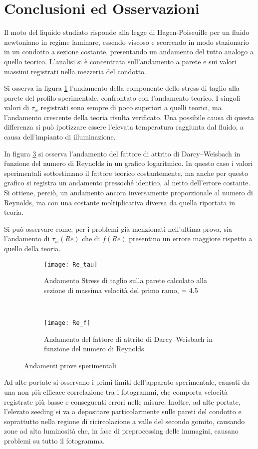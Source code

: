 \documentclass{article} %
\newcommand{\xd}{\nicefrac{\textrm{x}}{\textrm{D}}}
\begin{document}
\section{Conclusioni ed Osservazioni}
Il moto del liquido studiato risponde alla legge di Hagen-Poiseuille per un fluido newtoniano in regime laminare, essendo viscoso e scorrendo in modo stazionario in un condotto a sezione costante, presentando un andamento del tutto analogo a quello teorico. L'analisi si è concentrata sull'andamento a parete e sui valori massimi registrati nella mezzeria del condotto.\par
Si osserva in figura \ref{fig:Re_f} l'andamento della componente dello stress di taglio alla parete del profilo sperimentale, confrontato con l'andamento teorico. I singoli valori di $\tau_w$ registrati sono sempre di poco superiori a quelli teorici, ma l'andamento crescente della teoria risulta verificato. Una possibile causa di questa differenza si può ipotizzare essere l'elevata temperatura raggiunta dal fluido, a causa dell'impianto di illuminazione.\par
In figura \ref{fig:Re_tau} si osserva l'andamento del fattore di attrito di Darcy–Weisbach in funzione del numero di Reynolds in un grafico logaritmico. In questo caso i valori sperimentali sottostimano il fattore teorico costantemente, ma anche per questo grafico si registra un andamento pressoché identico, al netto dell'errore costante. Si ottiene, perciò, un andamento ancora inversamente proporzionale al numero di Reynolds, ma con una costante moltiplicativa diversa da quella riportata in teoria.\par
Si può osservare come, per i problemi già menzionati nell'ultima prova, sia l'andamento di $\tau_w(Re)$ che di $f(Re)$ presentino un errore maggiore rispetto a quello della teoria.\par
\begin{figure}[h!]
	\centering
	\begin{subfigure}{0.4\textwidth}
		\texttt{[image: Re\_tau]}
		\caption{Andamento Stress di taglio sulla parete calcolato alla sezione di massima velocità del primo ramo, \xd= 4.5}
		\label{fig:Re_f}
	\end{subfigure} ~ 
	\begin{subfigure}{0.4\textwidth}
		\texttt{[image: Re\_f]}
		\caption{Andamento del fattore di attrito di Darcy–Weisbach in funzione del numero di Reynolds}
		\label{fig:Re_tau}
	\end{subfigure}
	\caption{Andamenti prove sperimentali}
\end{figure}
Ad alte portate si osservano i primi limiti dell'apparato sperimentale, causati da una non più efficace correlazione tra i fotogrammi, che comporta velocità registrate più basse e conseguenti errori nelle misure. Inoltre, ad alte portate, l'elevato seeding si va a depositare particolarmente sulle pareti del condotto e soprattutto nella regione di ricircolazione a valle del secondo gomito, causando zone ad alta luminosità che, in fase di preprocessing delle immagini, causano problemi su tutto il fotogramma.
\end{document}

